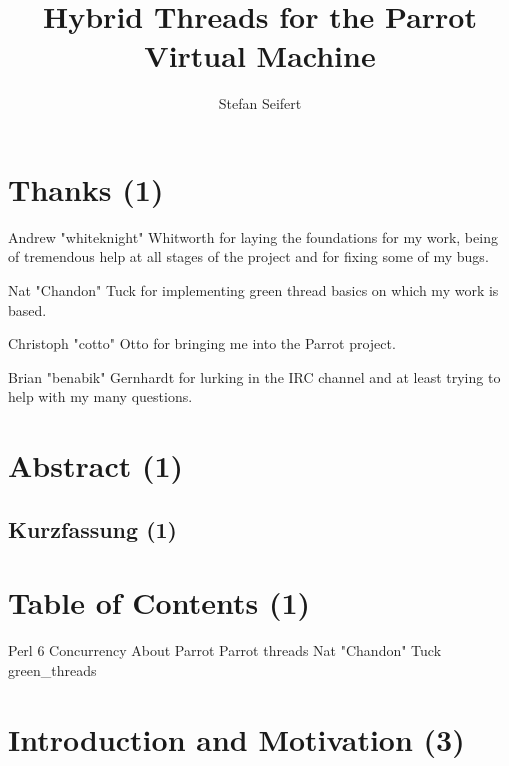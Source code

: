 \documentclass[bachelor,english]{hgbthesis}
\begin{document}
\title{Hybrid Threads for the Parrot Virtual Machine}

\author{Stefan Seifert}


\frontmatter
\maketitle
\tableofcontents

\chapter{Thanks (1)}

Andrew "whiteknight" Whitworth for laying the foundations for my work, being of tremendous help at all stages of the project and for fixing some of my bugs.

Nat "Chandon" Tuck for implementing green thread basics on which my work is based.

Christoph "cotto" Otto for bringing me into the Parrot project.

Brian "benabik" Gernhardt for lurking in the IRC channel and at least trying to help with my many questions.

\chapter{Abstract (1)}

\begin{german}
\chapter{Kurzfassung (1)}
\end{german}

\chapter{Table of Contents (1)}

	Perl 6 Concurrency
	About Parrot
	Parrot threads
	Nat "Chandon" Tuck green\_threads

\mainmatter

\chapter{Introduction and Motivation (3)}
\end{document}
